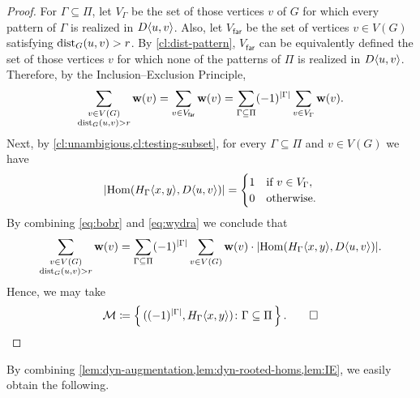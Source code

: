 \begin{proof}
	For $\Gamma\subseteq \Pi$, let $V_\Gamma$ be the set of those vertices $v$ of $G$ for which every pattern of $\Gamma$ is realized in $D\langle u,v\rangle$. Also, let $V_\mathsf{far}$ be the set of vertices $v\in V(G)$ satisfying $\mathrm{dist}_G(u,v)>r$. By \cref{cl:dist-pattern}, $V_\mathsf{far}$ can be equivalently defined the set of those vertices $v$ for which none of the patterns of $\Pi$ is realized in $D\langle u,v\rangle$. Therefore, by the Inclusion--Exclusion Principle,
	\begin{equation}\label{eq:bobr}
		\sum_{\substack{v\in V(G)\\ \mathrm{dist}_G(u,v)>r}} \mathbf{w}(v)=\sum_{v\in V_\mathsf{far}} \mathbf{w}(v) = \sum_{\Gamma\subseteq \Pi} (-1)^{|\Gamma|}\sum_{v\in V_\Gamma} \mathbf{w}(v).
	\end{equation}
	Next, by \cref{cl:unambigious,cl:testing-subset}, for every $\Gamma\subseteq \Pi$ and $v\in V(G)$ we have
	\begin{equation}\label{eq:wydra}
		|\mathrm{Hom}(H_\Gamma\langle x,y\rangle,D\langle u,v\rangle)|=\begin{cases}1 & \textrm{if }v\in V_\Gamma,\\ 0 & \textrm{otherwise.}\end{cases}
	\end{equation}
	By combining \eqref{eq:bobr} and \eqref{eq:wydra} we conclude that
	\begin{equation*}
		\sum_{\substack{v\in V(G)\\ \mathrm{dist}_G(u,v)>r}} \mathbf{w}(v)= \sum_{\Gamma\subseteq \Pi} (-1)^{|\Gamma|}\sum_{v\in V(G)} \mathbf{w}(v)\cdot |\mathrm{Hom}(H_\Gamma\langle x,y\rangle,D\langle u,v\rangle)|.
	\end{equation*}	
	Hence, we may take
	\[\mathcal{M}\coloneqq \left\{\,((-1)^{|\Gamma|},H_\Gamma\langle x,y\rangle)\colon \Gamma\subseteq \Pi\,\right\}.\qed\]
\end{proof}

By combining \cref{lem:dyn-augmentation,lem:dyn-rooted-homs,lem:IE}, we easily obtain the following.

